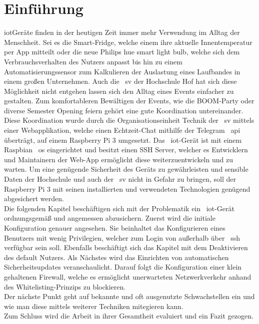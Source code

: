
\section{Einführung}\label{sec:einfuhrung}
\gls{iot}Geräte finden in der heutigen Zeit immer mehr Verwendung im Alltag der Menschheit.
Sei es die Smart-Fridge, welche einem ihre aktuelle Innentemperatur per App mitteilt oder die neue Philips hue smart light bulb,
welche sich dem Verbrauchsverhalten des Nutzers anpasst bis hin zu einem Automatisierungssensor zum Kalkulieren der Auslastung eines Laufbandes in einem großen Unternehmen.
Auch die ~\gls{sv} der Hochschule Hof hat sich diese Möglichkeit nicht entgehen lassen sich den Alltag eines Events einfacher zu gestalten.
Zum komfortableren Bewältigen der Events, wie die BOOM-Party oder diverse Semester Opening feiern gehört eine gute Koordination untereinander.
Diese Koordination wurde durch die Organisationseinheit Technik der ~\gls{sv} mittels einer Webapplikation, welche einen Echtzeit-Chat mithilfe der Telegram ~\gls{api} überträgt, auf einem Raspberry Pi 3 umgesetzt.
Das ~\gls{iot}-Gerät ist mit einem Raspbian ~\gls{os} eingerichtet und besitzt einen SSH Server, welcher es Entwicklern und Maintainern der Web-App ermöglicht diese weiterzuentwickeln und zu warten.
Um eine genügende Sicherheit des Geräts zu gewährleisten und sensible Daten der Hochschule und auch der ~\gls{sv} nicht in Gefahr zu bringen, soll der Raspberry Pi 3 mit seinen installierten und verwendeten Technologien genügend
abgesichert werden.\\
\blankline
Die folgenden Kapitel beschäftigen sich mit der Problematik ein ~\gls{iot}-Gerät ordnungsgemäß und angemessen abzusichern.
Zuerst wird die initiale Konfiguration genauer angesehen.
Sie beinhaltet das Konfigurieren eines Benutzers mit wenig Privilegien, welcher zum Login von außerhalb über ~\gls{ssh} verfügbar sein soll.
Ebenfalls beschäftigt sich das Kapitel mit dem Deaktivieren des default Nutzers.
Als Nächstes wird das Einrichten von automatischen Sicherheitsupdates veranschaulicht.
Darauf folgt die Konfiguration einer klein gehaltenen Firewall, welche es ermöglicht unerwarteten Netzwerkverkehr anhand des Whitelisting-Prinzips zu blockieren.\\
Der nächste Punkt geht auf bekannte und oft ausgenutzte Schwachstellen ein und wie man diese mittels weiterer Techniken mitegieren kann. \\
Zum Schluss wird die Arbeit in ihrer Gesamtheit evaluiert und ein Fazit gezogen.